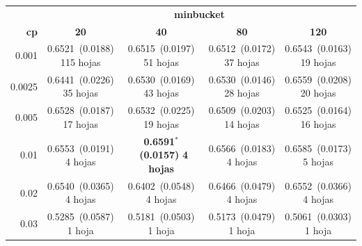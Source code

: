 \documentclass[twoside,a4paper,12pt,onecolumn,openany]{book}
\begin{document}
\begin{table}[H]
\centering
\small
\setlength{\tabcolsep}{4pt}
\begin{tabular}{r|cccc}
\toprule
 & \multicolumn{4}{c}{\textbf{minbucket}} \\
\cmidrule(lr){2-5}
\textbf{cp} & \textbf{20} & \textbf{40} & \textbf{80} & \textbf{120} \\
\midrule
0.001 & \shortstack{0.6521~(0.0188)\\ 115 hojas} & \shortstack{0.6515~(0.0197)\\ 51 hojas} & \shortstack{0.6512~(0.0172)\\ 37 hojas} & \shortstack{0.6543~(0.0163)\\ 19 hojas} \\[4pt]
0.0025 & \shortstack{0.6441~(0.0226)\\ 35 hojas} & \shortstack{0.6530~(0.0169)\\ 43 hojas} & \shortstack{0.6530~(0.0146)\\ 28 hojas} & \shortstack{0.6559~(0.0208)\\ 20 hojas} \\[4pt]
0.005 & \shortstack{0.6528~(0.0187)\\ 17 hojas} & \shortstack{0.6532~(0.0225)\\ 19 hojas} & \shortstack{0.6509~(0.0203)\\ 14 hojas} & \shortstack{0.6525~(0.0164)\\ 16 hojas} \\[4pt]
0.01 & \shortstack{0.6553~(0.0191)\\ 4 hojas} & \shortstack{\textbf{0.6591}$^{*}$~\textbf{(0.0157)}\\ \textbf{4 hojas}} & \shortstack{0.6566~(0.0183)\\ 4 hojas} & \shortstack{0.6585~(0.0173)\\ 5 hojas} \\[4pt]
0.02 & \shortstack{0.6540~(0.0365)\\ 4 hojas} & \shortstack{0.6402~(0.0548)\\ 4 hojas} & \shortstack{0.6466~(0.0479)\\ 4 hojas} & \shortstack{0.6552~(0.0366)\\ 4 hojas} \\[4pt]
0.03 & \shortstack{0.5285~(0.0587)\\ 1 hoja} & \shortstack{0.5181~(0.0503)\\ 1 hoja} & \shortstack{0.5173~(0.0479)\\ 1 hoja} & \shortstack{0.5061~(0.0303)\\ 1 hoja} \\[4pt]

\end{tabular}
\end{table}
\end{document}
